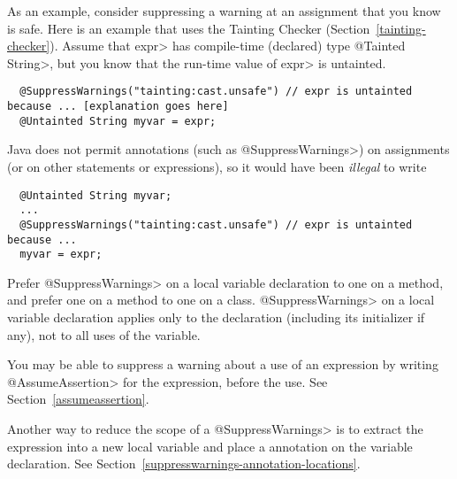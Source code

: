 As an example, consider suppressing a warning at an assignment that you know is
safe.  Here is an example that uses the Tainting Checker
(Section~\ref{tainting-checker}).  Assume that \<expr> has compile-time
(declared) type \<@Tainted String>, but you know that the run-time value of
\<expr> is untainted.

\begin{smaller}
\begin{Verbatim}
  @SuppressWarnings("tainting:cast.unsafe") // expr is untainted because ... [explanation goes here]
  @Untainted String myvar = expr;
\end{Verbatim}
\end{smaller}

\noindent
Java does not permit annotations (such as \<@SuppressWarnings>) on
assignments (or on other statements or expressions), so
it would have been \emph{illegal} to write

\begin{smaller}
\begin{Verbatim}
  @Untainted String myvar;
  ...
  @SuppressWarnings("tainting:cast.unsafe") // expr is untainted because ...
  myvar = expr;
\end{Verbatim}
\end{smaller}




Prefer \<@SuppressWarnings> on a local variable declaration to one on a method, and
prefer one on a method to one on a class.
\<@SuppressWarnings> on a local variable declaration applies only to the
declaration (including its initializer if any), not to all uses of the variable.

You may be able to suppress a warning about a use of an expression by
writing \<@AssumeAssertion> for the expression, before the use.  See
Section~\ref{assumeassertion}.

Another way to reduce the scope of a \<@SuppressWarnings> is to
extract the expression into a new local variable
and place a  annotation on the variable
declaration.  See Section~\ref{suppresswarnings-annotation-locations}.



